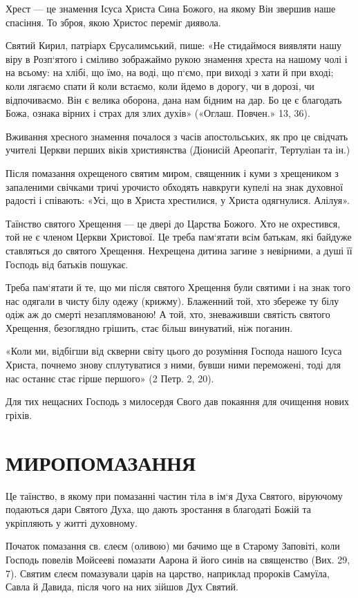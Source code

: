 \documentclass[main.tex]{subfiles}
\begin{document}
Хрест — це знамення Ісуса Христа Сина Божого, на якому Він звершив наше спасіння. То зброя, якою Христос переміг диявола.

Святий Кирил, патріарх Єрусалимський, пише: «Не стидаймося виявляти нашу віру в Розп`ятого і сміливо зображаймо рукою знамення хреста на нашому чолі і на всьому: на хлібі, що їмо, на воді, що п`ємо, при виході з хати й при вході; коли лягаємо спати й коли встаємо, коли йдемо в дорогу, чи в дорозі, чи відпочиваємо. Він є велика оборона, дана нам бідним на дар. Бо це є благодать Божа, ознака вірних і страх для злих духів» («Оглаш. Повчен.» 13, 36).

Вживання хресного знамення почалося з часів апостольських, як про це свідчать учителі Церкви перших віків християнства (Діонисій Ареопагіт, Тертуліан та ін.)

Після помазання охрещеного святим миром, священник і куми з хрещеником з запаленими свічками тричі урочисто обходять навкруги купелі на знак духовної радості і співають: «Усі, що в Христа хрестилися, у Христа одягнулися. Алілуя».

Таїнство святого Хрещення — це двері до Царства Божого. Хто не охрестився, той не є членом Церкви Христової. Це треба пам`ятати всім батькам, які байдуже ставляться до святого Хрещення. Нехрещена дитина загине з невірними, а душі її Господь від батьків пошукає.

Треба пам`ятати й те, що ми після святого Хрещення були святими і на знак того нас одягали в чисту білу одежу (крижму). Блаженний той, хто збереже ту білу одіж аж до смерті незаплямованою! А той, хто, зневаживши святість святого Хрещення, безоглядно грішить, стає більш винуватий, ніж поганин.

«Коли ми, відбігши від скверни світу цього до розуміння Господа нашого Ісуса Христа, почнемо знову сплутуватися з ними, бувши ними переможені, тоді для нас останнє стає гірше першого» (2 Петр. 2, 20).

Для тих нещасних Господь з милосердя Свого дав покаяння для очищення нових гріхів.

\section{МИРОПОМАЗАННЯ}

Це таїнство, в якому при помазанні частин тіла в ім`я Духа Святого, віруючому подаються дари Святого Духа, що дають зростання в благодаті Божій та укріпляють у житті духовному.

Початок помазання св. єлеєм (оливою) ми бачимо ще в Старому Заповіті, коли Господь повелів Мойсееві помазати Аарона й його синів на священство (Вих. 29, 7). Святим єлеєм помазували царів на царство, наприклад пророків Самуїла, Савла й Давида, після чого на них зійшов Дух Святий.
\end{document}
